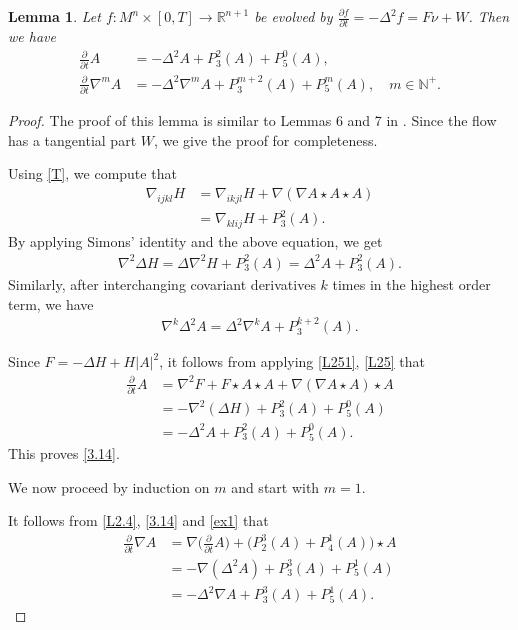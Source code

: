 \documentclass{amsart}
\newtheorem{lemma}[theorem]{Lemma}
\theoremstyle{definition}
\numberwithin{equation}{section}
\begin{document}
\begin{lemma}

Let $f: M^n\times [0, T] \rightarrow \mathbb{R}^{n+1}$ be evolved  by
    $ \frac{\partial f}{\partial t}=-\Delta^2 f=F \nu+W$. Then we have
\begin{align}\label{3.14}
\frac{\partial}{\partial t} A&=-\Delta^2 A+
P_3^2(A)+P_5^0(A),\\\label{3.15}
\frac{\partial}{\partial t} \nabla^{m} A&=-\Delta^{2} \nabla^{m}
A+P_{3}^{m+2}(A)+ P_{5}^{m}(A),\quad
m\in\mathbb{N^+}.
\end{align}
\end{lemma}

\begin{proof}
The proof of this lemma  is similar to Lemmas 6 and 7 in \cite{BWW}. Since the flow has a  tangential part $W$, we give the proof for completeness.
	
Using \eqref{T}, we compute that
\begin{align}
\nabla_{ijkl}   H&=\nabla_{ikjl}   H+\nabla(\nabla A\star A\star A)\nonumber\\
&=\nabla_{klij}   H+P_3^2(A).\nonumber
\end{align}
By applying Simons' identity and the above equation, we get
\begin{align}
\label{L251}
\nabla^{2} \Delta   H=\Delta\nabla^{2}  H+ P_3^2(A)=\Delta^2 A+P_3^2(A).
\end{align}
Similarly, after interchanging covariant derivatives $k$ times in the highest order term, we have
\begin{align}\label{ex1}
\nabla^{k} \Delta^2 A=\Delta^2\nabla^{k} A+ P_3^{k+2}(A).
\end{align}

Since $F=-\Delta H+H\vert A\vert ^2$, it follows from applying \eqref{L251}, \eqref{L25} that
\begin{align*}
\frac{\partial}{\partial t} A&= \nabla^{2} F+F\star A\star A+\nabla(\nabla A\star A)\star A \\
&=-\nabla^{2}(\Delta   H)+ P_3^2(A)+ P_5^0(A) \nonumber\\
&=-\Delta^2 A+ P_3^2(A)+ P_5^0(A).\nonumber
\end{align*}
This proves \eqref{3.14}.

We now proceed by induction on $m$ and start with $m=1$.



It follows from \eqref{L2.4},  \eqref{3.14} and \eqref{ex1}  that
\begin{align}
\frac{\partial}{\partial t} \nabla A&= \nabla \big (\frac{\partial}{\partial t} A\big)+\big(P_2^3(A)+P_4^1(A)\big)\star A \nonumber\\
&=-\nabla(\Delta^2 A)+ P_3^3(A)+ P_5^1(A)\nonumber\\
&=-\Delta^2\nabla A+ P_3^3(A)+ P_5^1(A).\nonumber
\end{align}


\end{proof}
\end{document}
